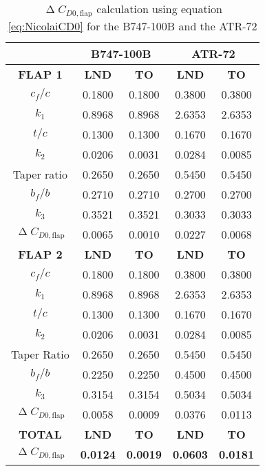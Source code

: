 \begin{table}[H]
  \centering
    \begin{tabular}{c|cc|cc}
    \toprule
    \multicolumn{1}{c}{\textbf{}} & \multicolumn{2}{c}{\textbf{B747-100B}} & \multicolumn{2}{c}{\textbf{ATR-72}} \\
    \midrule
    \multicolumn{1}{c}{\textbf{FLAP 1}} & \multicolumn{1}{c}{\textbf{LND}} & \multicolumn{1}{c}{\textbf{TO}} & \multicolumn{1}{c}{\textbf{LND}} & \multicolumn{1}{c}{\textbf{TO}} \\
    \midrule
    $c_f/c$  & 0.1800 & 0.1800 & 0.3800 & 0.3800 \\
    $k_1$    & 0.8968 & 0.8968 & 2.6353 & 2.6353 \\
    $t/c$   & 0.1300 & 0.1300 & 0.1670 & 0.1670 \\
    $k_2$    & 0.0206 & 0.0031 & 0.0284 & 0.0085 \\
    Taper ratio & 0.2650 & 0.2650 & 0.5450 & 0.5450 \\
    $b_f/b$  & 0.2710 & 0.2710 & 0.2700 & 0.2700 \\
    $k_3$    & 0.3521 & 0.3521 & 0.3033 & 0.3033 \\
    $\upDelta C_{D0,\text{flap}}$ & 0.0065 & 0.0010 & 0.0227 & 0.0068 \\
    \midrule
    \multicolumn{1}{c}{\textbf{FLAP 2}} & \multicolumn{1}{c}{\textbf{LND}} & \multicolumn{1}{c}{\textbf{TO}} & \multicolumn{1}{c}{\textbf{LND}} & \multicolumn{1}{c}{\textbf{TO}} \\
    \midrule
    $c_f/c$  & 0.1800 & 0.1800 & 0.3800 & 0.3800 \\
    $k_1$    & 0.8968 & 0.8968 & 2.6353 & 2.6353 \\
    $t/c$   & 0.1300 & 0.1300 & 0.1670 & 0.1670 \\
    $k_2$    & 0.0206 & 0.0031 & 0.0284 & 0.0085 \\
    Taper Ratio & 0.2650 & 0.2650 & 0.5450 & 0.5450 \\
    $b_f/b$  & 0.2250 & 0.2250 & 0.4500 & 0.4500 \\
    $k_3$    & 0.3154 & 0.3154 & 0.5034 & 0.5034 \\
    $\upDelta C_{D0,\text{flap}}$ & 0.0058 & 0.0009 & 0.0376 & 0.0113 \\
    \midrule
    \multicolumn{1}{c}{\textbf{TOTAL}} & \multicolumn{1}{c}{\textbf{LND}} & \multicolumn{1}{c}{\textbf{TO}} & \multicolumn{1}{c}{\textbf{LND}} & \multicolumn{1}{c}{\textbf{TO}} \\
    \midrule
    \textbf{$\upDelta C_{D0,\text{flap}}$} & \textbf{0.0124} & \textbf{0.0019} & \textbf{0.0603} & \textbf{0.0181} \\
    \bottomrule
    \end{tabular}
        \caption{$\upDelta C_{D0,\text{flap}}$ calculation using equation \ref{eq:NicolaiCD0} for the B747-100B and the ATR-72}
  \label{tab:YoungDeltaCD0}
\end{table}
